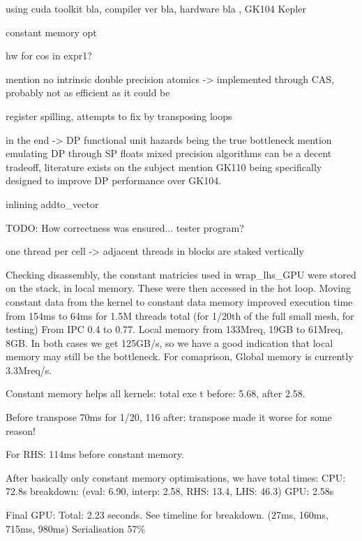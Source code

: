 \documentclass[11pt, oneside, a4paper]{article}
\begin{document}
using cuda toolkit bla, compiler ver bla, hardware bla , GK104 Kepler

constant memory opt

hw for cos in expr1? 

mention no intrinsic double precision atomics -> implemented through CAS, probably not as efficient as it could be

register spilling, attempts to fix by transposing loops

in the end -> DP functional unit hazards being the true bottleneck
mention emulating DP through SP floats
mixed precision algorithms can be a decent tradeoff, literature exists on the subject
mention GK110 being specifically designed to improve DP performance over GK104.

inlining addto\_vector

TODO: How correctness was ensured... tester program?

one thread per cell -> adjacent threads in blocks are staked vertically

Checking disassembly, the constant matricies used in wrap\_lhs\_GPU were stored on the stack, in local memory. These were then accessed in the hot loop.
Moving constant data from the kernel to constant data memory improved execution time from 154ms to 64ms for 1.5M threads total (for 1/20th of the full small mesh, for testing)
From IPC 0.4 to 0.77.
Local memory from 133Mreq, 19GB to 61Mreq, 8GB.
In both cases we get 125GB/s, so we have a good indication that local memory may still be the bottleneck.
For comaprison, Global memory is currently 3.3Mreq/s.

Constant memory helps all kernels: total exe t before: 5.68, after 2.58.

Before transpose 70ms for 1/20, 116 after: transpose made it worse for some reason!

For RHS: 114ms before constant memory.

After basically only constant memory optimisations, we have total times:
CPU: 72.8s breakdown: (eval: 6.90, interp: 2.58, RHS: 13.4, LHS: 46.3)
GPU: 2.58s


Final GPU:
Total: 2.23 seconds. See timeline for breakdown. (27ms, 160ms, 715ms, 980ms)
Serialisation 57\%





\end{document}
